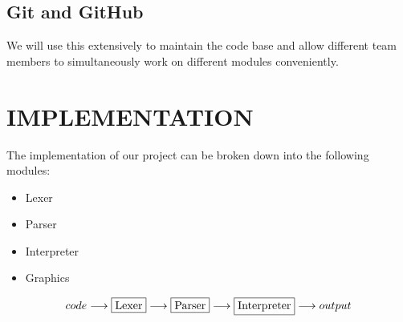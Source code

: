 \documentclass{article}
\begin{document}
\subsection {Git and GitHub}We will use this extensively to maintain the code base and allow different team members to simultaneously work on different modules conveniently. 
\section{IMPLEMENTATION}
The implementation of our project can be broken down into the following modules:
\begin{itemize}
\item Lexer
\item Parser
\item Interpreter
\item Graphics
\end{itemize}
$$code \longrightarrow \framebox{Lexer} \longrightarrow \framebox{Parser} \longrightarrow \framebox{Interpreter} \longrightarrow output$$
\end{document}
